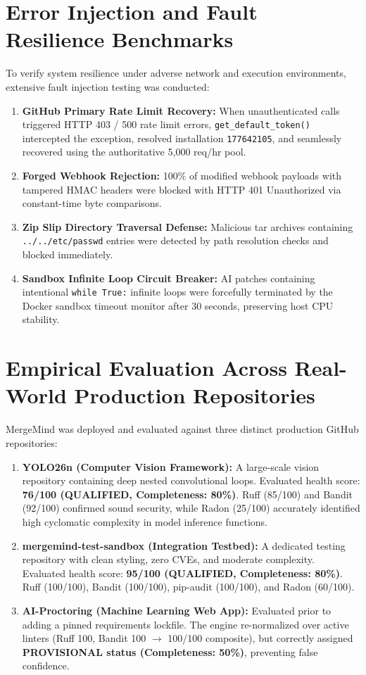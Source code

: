 \documentclass[12pt,a4paper,oneside]{report}
\begin{document}
\section{Error Injection and Fault Resilience Benchmarks}
\label{sec:error-injection}

To verify system resilience under adverse network and execution environments, extensive fault injection testing was conducted:

\begin{enumerate}
    \item \textbf{GitHub Primary Rate Limit Recovery:} When unauthenticated calls triggered HTTP 403 / 500 rate limit errors, \texttt{get\_default\_token()} intercepted the exception, resolved installation \texttt{177642105}, and seamlessly recovered using the authoritative 5,000 req/hr pool.
    \item \textbf{Forged Webhook Rejection:} 100\% of modified webhook payloads with tampered HMAC headers were blocked with HTTP 401 Unauthorized via constant-time byte comparisons.
    \item \textbf{Zip Slip Directory Traversal Defense:} Malicious tar archives containing \texttt{../../etc/passwd} entries were detected by path resolution checks and blocked immediately.
    \item \textbf{Sandbox Infinite Loop Circuit Breaker:} AI patches containing intentional \texttt{while True:} infinite loops were forcefully terminated by the Docker sandbox timeout monitor after 30 seconds, preserving host CPU stability.
\end{enumerate}

\section{Empirical Evaluation Across Real-World Production Repositories}
\label{sec:empirical-results}

MergeMind was deployed and evaluated against three distinct production GitHub repositories:

\begin{enumerate}
    \item \textbf{YOLO26n (Computer Vision Framework):} A large-scale vision repository containing deep nested convolutional loops. Evaluated health score: \textbf{76/100 (QUALIFIED, Completeness: 80\%)}. Ruff (85/100) and Bandit (92/100) confirmed sound security, while Radon (25/100) accurately identified high cyclomatic complexity in model inference functions.
    \item \textbf{mergemind-test-sandbox (Integration Testbed):} A dedicated testing repository with clean styling, zero CVEs, and moderate complexity. Evaluated health score: \textbf{95/100 (QUALIFIED, Completeness: 80\%)}. Ruff (100/100), Bandit (100/100), pip-audit (100/100), and Radon (60/100).
    \item \textbf{AI-Proctoring (Machine Learning Web App):} Evaluated prior to adding a pinned requirements lockfile. The engine re-normalized over active linters (Ruff 100, Bandit 100 $\to$ 100/100 composite), but correctly assigned \textbf{PROVISIONAL status (Completeness: 50\%)}, preventing false confidence.
\end{enumerate}
\end{document}
